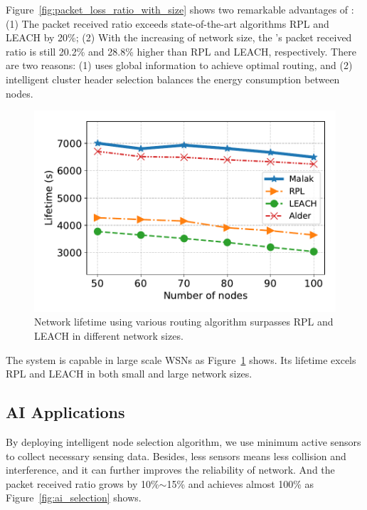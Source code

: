 Figure~\ref{fig:packet_loss_ratio_with_size} shows two remarkable advantages of
{\sdn}: (1) The packet received ratio exceeds state-of-the-art algorithms
RPL\cite{winter2012rpl} and LEACH\cite{kaur2016wsn} by 20\%; (2) With the
increasing of network size, the {\sdn}'s packet received ratio is still 20.2\%
and 28.8\% higher than RPL and LEACH, respectively. There are two reasons: (1) {\sdn}
uses global information to achieve optimal routing, and (2) intelligent cluster
header selection balances the energy consumption between nodes.

\begin{figure}[!h]
	\centering
	\includegraphics[width=.95\columnwidth]{Figure/lifetime}
	\vspace{-0.1in}
	\caption{Network lifetime using various routing algorithm
		\textnormal{
			{\sdn} surpasses RPL and LEACH in different network sizes.
		}}
	\label{fig:lifetime}
\end{figure}

The{\sdn} system is capable in large scale WSNs as
Figure~\ref{fig:lifetime} shows. Its lifetime excels RPL and LEACH in both
small and large network sizes.

\subsection{AI Applications}

By deploying intelligent node selection algorithm, we use minimum active sensors
to collect necessary sensing data.
Besides, less sensors means less collision and
interference, and it can further improves the reliability of network. And the
packet received ratio grows by 10\%$\sim$15\% and achieves almost 100\% as
Figure~\ref{fig:ai_selection} shows.

